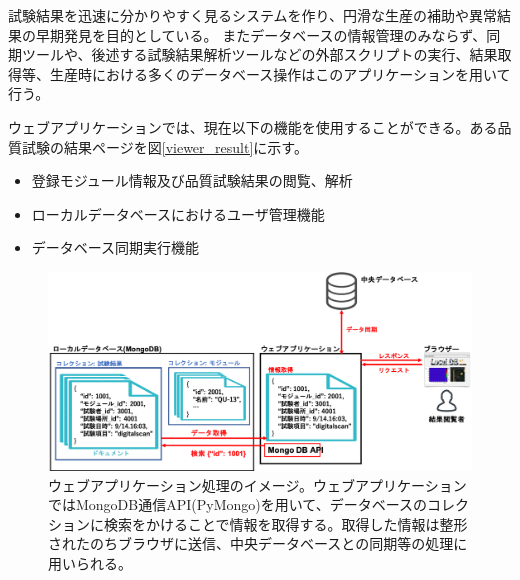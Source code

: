 試験結果を迅速に分かりやすく見るシステムを作り、円滑な生産の補助や異常結果の早期発見を目的としている。
またデータベースの情報管理のみならず、同期ツールや、後述する試験結果解析ツールなどの外部スクリプトの実行、結果取得等、生産時における多くのデータベース操作はこのアプリケーションを用いて行う。

ウェブアプリケーションでは、現在以下の機能を使用することができる。ある品質試験の結果ページを図\ref{viewer_result}に示す。
\begin{itemize}
  \item 登録モジュール情報及び品質試験結果の閲覧、解析
  \item ローカルデータベースにおけるユーザ管理機能
  \item データベース同期実行機能
\end{itemize}

\begin{figure}[bpt]\centering
\includegraphics[width=16cm]{webapp_process}
\caption[ウェブアプリケーション処理のイメージ]{ウェブアプリケーション処理のイメージ。ウェブアプリケーションではMongoDB通信API(PyMongo)を用いて、データベースのコレクションに検索をかけることで情報を取得する。取得した情報は整形されたのちブラウザに送信、中央データベースとの同期等の処理に用いられる。}
\label{webapp_process}
\end{figure}

